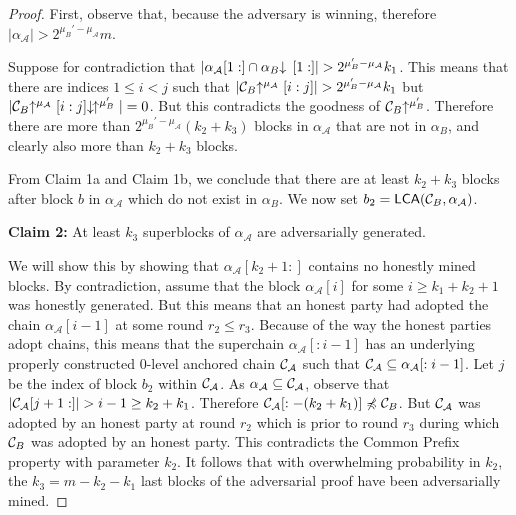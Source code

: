 \begin{proof}
    First, observe that, because the adversary is winning, therefore
    $|\alpha_\mathcal{A}| > 2^{\mu_B' - \mu_\mathcal{A}}m$.

    Suppose for contradiction that $|\alpha_\mathcal{A}[1:] \cap
    \alpha_B\negthickspace\downarrow\,[1:]| > 2^{\mu_B' - \mu_\mathcal{A}} k_1$. This means that
    there are indices $1 \leq i < j$ such that
    $|\mathcal{C}_B\negthickspace\uparrow^{\mu_\mathcal{A}}[i:j]| > 2^{\mu_B' - \mu_\mathcal{A}}
    k_1$ but
    $|\mathcal{C}_B\negthickspace\uparrow^{\mu_\mathcal{A}}[i:j]\negthickspace\downarrow\,\negthickspace\uparrow^{\mu_B'}| = 0$.
    But this contradicts the goodness of $\mathcal{C}_B\negthickspace\uparrow^{\mu_B'}$. Therefore
    there are more than $2^{\mu_B' - \mu_\mathcal{A}}(k_2 + k_3)$ blocks in
    $\alpha_\mathcal{A}$ that are not in $\alpha_B$, and clearly also more than $k_2 + k_3$ blocks.

    From Claim 1a and Claim 1b, we conclude that there are at least $k_2 + k_3$
    blocks after block $b$ in $\alpha_\mathcal{A}$ which do not exist in
    $\alpha_B$. We now set $b_2 = \textsf{LCA}(\mathcal{C}_B, \alpha_\mathcal{A})$.

    \textbf{Claim 2: } At least $k_3$ superblocks of $\alpha_\mathcal{A}$ are
    adversarially generated.

    We will show this by showing that $\alpha_\mathcal{A}[k_2 + 1:]$ contains
    no honestly mined blocks. By contradiction, assume that the block
    $\alpha_\mathcal{A}[i]$ for some $i \geq k_1 + k_2 + 1$ was honestly generated.
    But this means that an honest party had adopted the chain
    $\alpha_\mathcal{A}[i - 1]$ at some round $r_2 \leq r_3$. Because of the
    way the honest parties adopt chains, this means that the superchain
    $\alpha_\mathcal{A}[:i - 1]$ has an underlying properly constructed
    $0$-level anchored chain $\mathcal{C}_\mathcal{A}$ such that
    $\mathcal{C}_\mathcal{A} \subseteq \alpha_\mathcal{A}[:i - 1]$. Let $j$ be
    the index of block $b_2$ within $\mathcal{C}_\mathcal{A}$.  As
    $\alpha_\mathcal{A} \subseteq \mathcal{C}_\mathcal{A}$, observe that
    $|\mathcal{C}_\mathcal{A}[j + 1:]| > i -
    1 \geq k_2 + k_1$.  Therefore $\mathcal{C}_\mathcal{A}[:-(k_2 + k_1)] \not\preccurlyeq
    \mathcal{C}_B$.  But $\mathcal{C}_\mathcal{A}$ was adopted by an honest party at
    round $r_2$ which is prior to round $r_3$ during which $\mathcal{C}_B$ was
    adopted by an honest party. This contradicts the Common Prefix
    \cite{backbone} property with parameter $k_2$.
    It follows that with overwhelming probability in $k_2$, the $k_3 = m - k_2 -
    k_1$ last blocks of the adversarial proof have been adversarially mined.


\end{proof}
